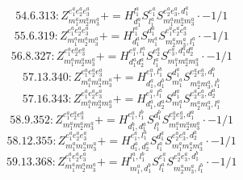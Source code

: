 \documentclass[letterpaper,10pt,fleqn,leqno,onecolumn]{article}
\begin{document}
\begin{equation} \;\;\;\;\;\;  54.6.313: Z^{e_{1}^{a}e_{2}^{a}e_{3}^{a}}_{m_{1}^{a}m_{2}^{a}m_{3}^{a}}+=H^{l_{1}^{a}}_{d_{1}^{a}}S^{e_{1}^{a}}_{l_{1}^{a}}S^{e_{2}^{a}e_{3}^{a},d_{1}^{a}}_{m_{1}^{a}m_{2}^{a}m_{3}^{a}}\cdot -1/1 \end{equation}
\begin{equation} \;\;\;\;\;\;  55.6.319: Z^{e_{1}^{a}e_{2}^{a}e_{3}^{a}}_{m_{1}^{a}m_{2}^{a}m_{3}^{a}}+=H^{l_{1}^{a}}_{d_{1}^{a}}S^{d_{1}^{a}}_{m_{1}^{a}}S^{e_{1}^{a}e_{2}^{a}e_{3}^{a}}_{m_{2}^{a}m_{3}^{a},l_{1}^{a}}\cdot -1/1 \end{equation}
\begin{equation} \;\;\;\;\;\;  56.8.327: Z^{e_{1}^{a}e_{2}^{a}e_{3}^{a}}_{m_{1}^{a}m_{2}^{a}m_{3}^{a}}+=H^{e_{1}^{a},l_{1}^{a}}_{d_{1}^{a}d_{2}^{a}}S^{e_{2}^{a}}_{l_{1}^{a}}S^{e_{3}^{a},d_{1}^{a}d_{2}^{a}}_{m_{1}^{a}m_{2}^{a}m_{3}^{a}}\cdot -1/1 \end{equation}
\begin{equation} \;\;\;\;\;\;  57.13.340: Z^{e_{1}^{a}e_{2}^{a}e_{3}^{a}}_{m_{1}^{a}m_{2}^{a}m_{3}^{a}}+=H^{e_{1}^{a},l_{1}^{b}}_{d_{1}^{a},d_{1}^{b}}S^{d_{1}^{a}}_{m_{1}^{a}}S^{e_{2}^{a}e_{3}^{a},d_{1}^{b}}_{m_{2}^{a}m_{3}^{a},l_{1}^{b}} \end{equation}
\begin{equation} \;\;\;\;\;\;  57.16.343: Z^{e_{1}^{a}e_{2}^{a}e_{3}^{a}}_{m_{1}^{a}m_{2}^{a}m_{3}^{a}}+=H^{e_{1}^{a},l_{1}^{a}}_{d_{1}^{a},d_{2}^{a}}S^{d_{1}^{a}}_{m_{1}^{a}}S^{e_{2}^{a}e_{3}^{a},d_{2}^{a}}_{m_{2}^{a}m_{3}^{a},l_{1}^{a}} \end{equation}
\begin{equation} \;\;\;\;\;\;  58.9.352: Z^{e_{1}^{a}e_{2}^{a}e_{3}^{a}}_{m_{1}^{a}m_{2}^{a}m_{3}^{a}}+=H^{e_{1}^{a},l_{1}^{b}}_{d_{1}^{b},d_{1}^{a}}S^{d_{1}^{b}}_{l_{1}^{b}}S^{e_{2}^{a}e_{3}^{a},d_{1}^{a}}_{m_{1}^{a}m_{2}^{a}m_{3}^{a}}\cdot -1/1 \end{equation}
\begin{equation} \;\;\;\;\;\;  58.12.355: Z^{e_{1}^{a}e_{2}^{a}e_{3}^{a}}_{m_{1}^{a}m_{2}^{a}m_{3}^{a}}+=H^{e_{1}^{a},l_{1}^{a}}_{d_{1}^{a},d_{2}^{a}}S^{d_{1}^{a}}_{l_{1}^{a}}S^{e_{2}^{a}e_{3}^{a},d_{2}^{a}}_{m_{1}^{a}m_{2}^{a}m_{3}^{a}}\cdot -1/1 \end{equation}
\begin{equation} \;\;\;\;\;\;  59.13.368: Z^{e_{1}^{a}e_{2}^{a}e_{3}^{a}}_{m_{1}^{a}m_{2}^{a}m_{3}^{a}}+=H^{l_{1}^{a},l_{1}^{b}}_{m_{1}^{a},d_{1}^{b}}S^{e_{1}^{a}}_{l_{1}^{a}}S^{e_{2}^{a}e_{3}^{a},d_{1}^{b}}_{m_{2}^{a}m_{3}^{a},l_{1}^{b}}\cdot -1/1 \end{equation}
\end{document}
